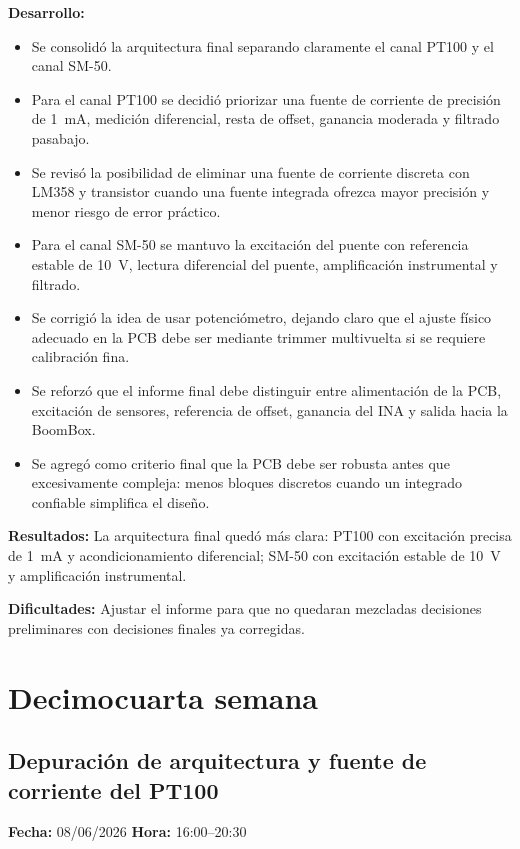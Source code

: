 \documentclass[12pt]{article}
\begin{document}
\textbf{Desarrollo:}
\begin{itemize}
\item Se consolidó la arquitectura final separando claramente el canal PT100 y el canal SM-50.
\item Para el canal PT100 se decidió priorizar una fuente de corriente de precisión de \SI{1}{mA}, medición diferencial, resta de offset, ganancia moderada y filtrado pasabajo.
\item Se revisó la posibilidad de eliminar una fuente de corriente discreta con LM358 y transistor cuando una fuente integrada ofrezca mayor precisión y menor riesgo de error práctico.
\item Para el canal SM-50 se mantuvo la excitación del puente con referencia estable de \SI{10}{V}, lectura diferencial del puente, amplificación instrumental y filtrado.
\item Se corrigió la idea de usar potenciómetro, dejando claro que el ajuste físico adecuado en la PCB debe ser mediante trimmer multivuelta si se requiere calibración fina.
\item Se reforzó que el informe final debe distinguir entre alimentación de la PCB, excitación de sensores, referencia de offset, ganancia del INA y salida hacia la BoomBox.
\item Se agregó como criterio final que la PCB debe ser robusta antes que excesivamente compleja: menos bloques discretos cuando un integrado confiable simplifica el diseño.
\end{itemize}

\textbf{Resultados:}
La arquitectura final quedó más clara: PT100 con excitación precisa de \SI{1}{mA} y acondicionamiento diferencial; SM-50 con excitación estable de \SI{10}{V} y amplificación instrumental.

\textbf{Dificultades:}
Ajustar el informe para que no quedaran mezcladas decisiones preliminares con decisiones finales ya corregidas.%
\section{Decimocuarta semana}

\subsection{Depuración de arquitectura y fuente de corriente del PT100}
\textbf{Fecha:} 08/06/2026 \quad \textbf{Hora:} 16:00--20:30
\end{document}
